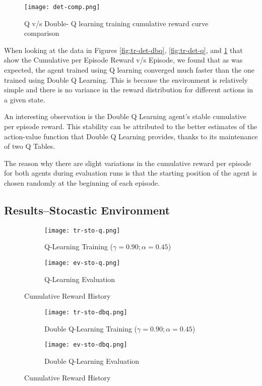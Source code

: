 \documentclass{article} %
\begin{document}

\begin{figure}[H]
    \centering
    \texttt{[image: det-comp.png]}
    \caption{Q v/s Double- Q learning training cumulative reward curve comparison}
    \label{fig:det-comp}
\end{figure}

When looking at the data in Figures \ref{fig:tr-det-dbq}, \ref{fig:tr-det-q}, and
\ref{fig:det-comp} that show the Cumulative per Episode Reward v/s Episode, we found that
as was expected, the agent trained using Q learning converged much faster than the one
trained using Double Q Learning. This is because the environment is relatively simple and 
there is no variance in the reward distribution for different actions in a given state.

An interesting observation is the Double Q Learning agent's stable cumulative per episode
reward. This stability can be attributed to the better estimates of the action-value
function that Double Q Learning provides, thanks to its maintenance of two Q Tables. 

The reason why there are slight variations in the cumulative reward per episode for both
agents during evaluation runs is that the starting position of the agent is chosen randomly
at the beginning of each episode.

\subsection{Results--Stocastic Environment}

\begin{figure}[ht]
    \begin{subfigure}{.45\textwidth}
        \centering
        \texttt{[image: tr-sto-q.png]}
        \caption{Q-Learning Training  ($\gamma=0.90; \alpha=0.45$)}
        \label{fig:tr-sto-q}
    \end{subfigure}
    \hfill
    \begin{subfigure}{.45\textwidth}
        \centering
        \texttt{[image: ev-sto-q.png]}
        \caption{Q-Learning Evaluation}
        \label{fig:ev-sto-q}
    \end{subfigure}
    \caption{Cumulative Reward History}
\end{figure}


\begin{figure}[ht]
    \begin{subfigure}{.45\textwidth}
        \centering
        \texttt{[image: tr-sto-dbq.png]}
        \caption{Double Q-Learning Training ($\gamma=0.90; \alpha=0.45$)}
        \label{fig:tr-sto-dbq}
    \end{subfigure}
    \hfill
    \begin{subfigure}{.45\textwidth}
        \centering
        \texttt{[image: ev-sto-dbq.png]}
        \caption{Double Q-Learning Evaluation}
        \label{fig:ev-sto-dbq}
    \end{subfigure}
    \caption{Cumulative Reward History}
\end{figure}
\end{document}
